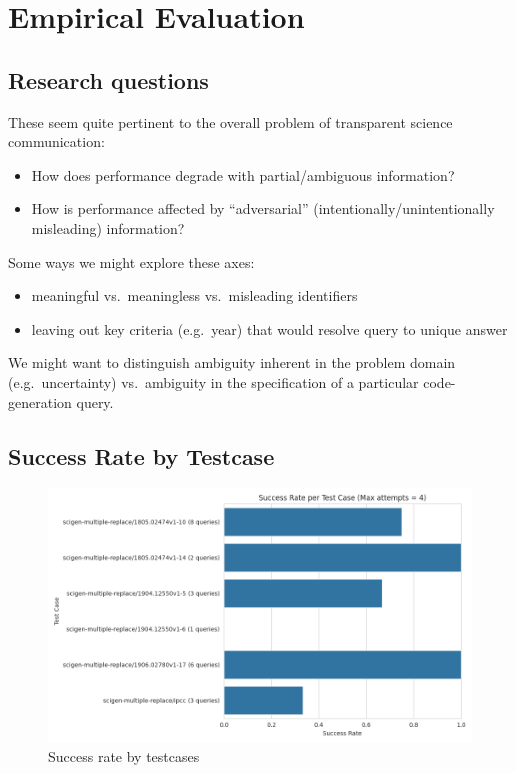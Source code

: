 \section{Empirical Evaluation}
\label{sec:evaluation}

\subsection{Research questions}

These seem quite pertinent to the overall problem of transparent science communication:
\begin{itemize}
\item How does performance degrade with partial/ambiguous information?
\item How is performance affected by ``adversarial'' (intentionally/unintentionally misleading) information?
\end{itemize}

Some ways we might explore these axes:
\begin{itemize}
\item meaningful vs.~meaningless vs.~misleading identifiers
\item leaving out key criteria (e.g.~year) that would resolve query to unique answer
\end{itemize}

We might want to distinguish ambiguity inherent in the problem domain (e.g.~uncertainty) vs.~ambiguity in the
specification of a particular code-generation query.

\subsection{Success Rate by Testcase}
\label{subsec:success_rate_by_test_case}

\begin{figure}[!h]
    \centering
    \includegraphics[width=0.95\linewidth]{fig/success_rate_by_test_case}
    \caption{Success rate by testcases}\label{fig:success_rate_by_test_case}
\end{figure}
